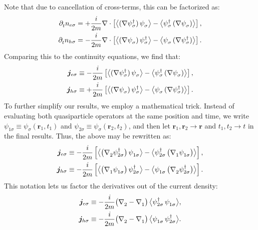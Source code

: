 Note that due to cancellation of cross-terms, this can be factorized as:
\begin{align}
  \p t n_{e\sigma} &=
  +\frac{i}{2m} \nabla \cdot 
  \left[ \avg[\big]{(\nabla \hc{\psi_{\sigma}})\, \pc{\psi_{\sigma}}} -
         \avg[\big]{\hc{\psi_{\sigma}}\, (\nabla \pc{\psi_{\sigma}})} \right], \\
  \p t n_{h\sigma} &=
  -\frac{i}{2m} \nabla \cdot
  \left[ \avg[\big]{(\nabla \pc{\psi_{\sigma}})\, \hc{\psi_{\sigma}}} -
         \avg[\big]{\pc{\psi_{\sigma}}\, (\nabla \hc{\psi_{\sigma}})} \right].
\end{align}
Comparing this to the continuity equations, we find that:
\begin{align}
  \bm{j}_{e\sigma} &\equiv
  -\frac{i}{2m} 
  \left[ \avg[\big]{(\nabla \hc{\psi_{\sigma}})\, \pc{\psi_{\sigma}}} -
         \avg[\big]{\hc{\psi_{\sigma}}\, (\nabla \pc{\psi_{\sigma}})} \right], \\
  \bm{j}_{h\sigma} &\equiv
  +\frac{i}{2m}
  \left[ \avg[\big]{(\nabla \pc{\psi_{\sigma}})\, \hc{\psi_{\sigma}}} -
         \avg[\big]{\pc{\psi_{\sigma}}\, (\nabla \hc{\psi_{\sigma}})} \right].
\end{align}
To further simplify our results, we employ a mathematical trick.
Instead of evaluating both quasiparticle operators at the same position and time, we write $\psi_{1 \sigma} \equiv \psi_\sigma(\bm{r}_1,t_1)$ and $\psi_{2 \sigma} \equiv \psi_\sigma(\bm{r}_2,t_2)$, and then let $\bm{r}_1,\bm{r}_2 \rightarrow \bm{r}$ and $t_1,t_2 \rightarrow t$ in the final results.
Thus, the above may be rewritten as:
\begin{align}
  \bm{j}_{e\sigma} &\equiv
  -\frac{i}{2m} 
  \left[ \avg[\big]{\big(\pc{\nabla_2} \hc{\psi_{2 \sigma}}\big)\, \pc{\psi_{1 \sigma}}} -
  \avg[\big]{\hc{\psi_{2 \sigma}}\, \big(\pc{\nabla_1} \pc{\psi_{1 \sigma}}\big)} \right], \\
  \bm{j}_{h\sigma} &\equiv
  -\frac{i}{2m}
  \left[ \avg[\big]{\big(\pc{\nabla_1} \pc{\psi_{1 \sigma}}\big)\, \hc{\psi_{2 \sigma}}} -
  \avg[\big]{\pc{\psi_{1 \sigma}}\, \big(\pc{\nabla_2} \hc{\psi_{2 \sigma}}\big)} \right].
\end{align}
This notation lets us factor the derivatives out of the current density:
\begin{align}
  \bm{j}_{e\sigma} &\equiv
  -\frac{i}{2m} \big(\pc{\nabla_2} - \pc{\nabla_1}\big) \,
  \avg[\big]{\hc{\psi_{2 \sigma}}\, \pc{\psi_{1 \sigma}}} ,\\
  \bm{j}_{h\sigma} &\equiv
  -\frac{i}{2m} \big(\pc{\nabla_2} - \pc{\nabla_1}\big) \,
  \avg[\big]{\pc{\psi_{1 \sigma}}\, \hc{\psi_{2 \sigma}}} .
\end{align}

